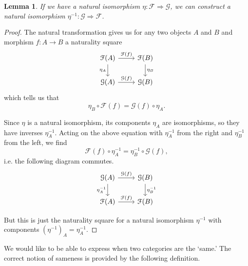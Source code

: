 \documentclass[a4paper,10pt]{scrreprt}
\theoremstyle{definition}
\theoremstyle{plain}
\newtheorem{lemma}{Lemma}[section]
\theoremstyle{remark}
\begin{document}
\begin{lemma}
  \label{lemma:naturalisomorphismshaveinverses}
  If we have a natural isomorphism $\eta\colon \mathcal{F} \Rightarrow \mathcal{G}$, we can construct a natural isomorphism $\eta^{-1}\colon \mathcal{G} \Rightarrow \mathcal{F}$.
\end{lemma}
\begin{proof}
  The natural transformation gives us for any two objects $A$ and $B$ and morphism $f\colon A \to B$ a naturality square
  \begin{equation*}
    \begin{tikzcd}
      \mathcal{F}(A)
      \arrow[r, "\mathcal{F}(f)"]
      \arrow[d, swap, "\eta_{A}"]
      & \mathcal{F}(B)
      \arrow[d, "\eta_{B}"]
      \\
      \mathcal{G}(A)
      \arrow[r, "\mathcal{G}(f)"]
      & \mathcal{G}(B)
    \end{tikzcd}
  \end{equation*}
  which tells us that 
  \begin{equation*}
    \eta_{B} \circ \mathcal{F}(f) = \mathcal{G}(f) \circ \eta_{A}.
  \end{equation*}

  Since $\eta$ is a natural isomorphism, its components $\eta_{A}$ are isomorphisms, so they have inverses $\eta_{A}^{-1}$. Acting on the above equation with $\eta_{A}^{-1}$ from the right and $\eta_{B}^{-1}$ from the left, we find
  \begin{equation*}
    \mathcal{F}(f) \circ \eta_{A}^{-1} = \eta_{B}^{-1} \circ \mathcal{G}(f),
  \end{equation*}
  i.e. the following diagram commutes.
  \begin{equation*}
    \begin{tikzcd}
      \mathcal{G}(A)
      \arrow[r, "\mathcal{G}(f)"]
      \arrow[d, swap, "\eta_{A}^{-1}"]
      & \mathcal{G}(B)
      \arrow[d, "\eta_{B}^{-1}"]
      \\
      \mathcal{F}(A)
      \arrow[r, "\mathcal{F}(f)"]
      & \mathcal{F}(B)
    \end{tikzcd}
  \end{equation*}

  But this is just the naturality square for a natural isomorphism $\eta^{-1}$ with components $(\eta^{-1})_{A} = \eta_{A}^{-1}$.
\end{proof}

We would like to be able to express when two categories are the `same.' The correct notion of sameness is provided by the following definition.
\end{document}

